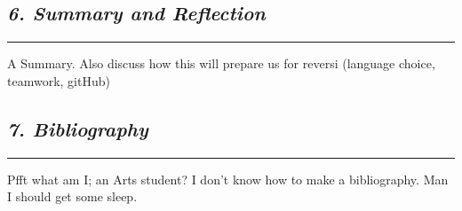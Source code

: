 \documentclass[10pt,twocolumn]{article}
\begin{document}
\subsection*{\emph { \textmd{6. Summary and Reflection}}}
\hrule
\vspace{0.4cm}

A Summary. Also discuss how this will prepare us for reversi (language choice,
teamwork, gitHub)


\subsection*{\emph { \textmd{7. Bibliography}}}
\hrule
\vspace{0.4cm}
Pfft what am I; an Arts student? I don't know how to make a bibliography.
Man I should get some sleep.
\end{document}
